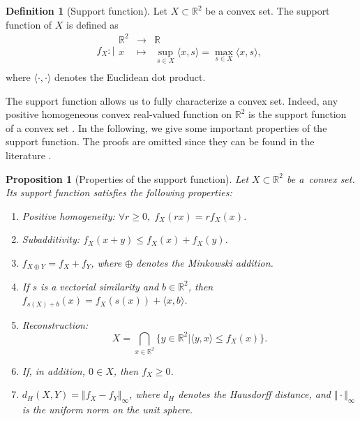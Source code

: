 \documentclass[numbers,compress,v1.0.1]{vmsta}
\newtheorem{proposition}{Proposition}
\theoremstyle{definition}
\newtheorem{definition}{Definition}
\begin{document}
\begin{definition}[Support function]
Let $X\subset\mathbb{R}^2$ be a convex set. The support function of
$X$ is defined as
%
\begin{displaymath}
f_X: \Bigg\vert %
\begin{array}{rcl}
\mathbb{R}^2 & \longrightarrow&\mathbb{R}\\
x & \longmapsto& \sup_{s\in X}\langle x,s\rangle=\max_{s\in X}\langle
x,s\rangle,\\
\end{array} %
\end{displaymath}
%
where $\langle\cdot,\cdot\rangle$ denotes the Euclidean dot product.
\end{definition}
%
The support function allows us to fully characterize a convex set.
Indeed, any positive homogeneous convex real-valued function on $\mathbb
{R}^2$ is the support function of a convex set \cite
{schneider2013convex}. In the following, we give some important
properties of the support function. The proofs are omitted since they
can be found in the literature \citep{gardner1995geometric,schneider2013convex}.
%
\begin{proposition}[Properties of the support function]
\label{prop:supportfunct}
Let $X\subset\mathbb{R}^2$ be a~convex set. Its support function
satisfies the following properties:
%
\begin{enumerate}
%
\item\label{it:positivementhomogene} \textit{Positive homogeneity}:
$\forall r\geq0,\; f_X(rx)=rf_X(x)$.
%
\item\label{it:sousadditive} \textit{Subadditivity}: $ f_X(x+y)\leq
f_X(x)+f_X(y)$.
\item\label{it:Minkadditive} $f_{X\oplus Y}= f_X+f_Y $, where $\oplus$
denotes the Minkowski addition.
%
\item\label{it:Invariance} If $s$ is a vectorial similarity and $b\in
\mathbb{R}^2$, then $f_{s(X)+b}(x)=f_X(s(x))+\langle x,b\rangle$.
%
\item\label{it:reconstruction} Reconstruction:
%
\begin{equation}
X=\bigcap_{x\in\mathbb{R}^2}\bigl\lbrace y\in
\mathbb{R}^2 \big\vert\langle y,x\rangle\leq f_X(x)\bigr
\rbrace. \label{eq:reconstruction}
\end{equation}
%
\item\label{it:positiviteContOrig} If, in addition, $0\in X$, then
$f_X\geq0$.
%
\item\label{it:hausdorff} $d_H(X,Y)=\Vert f_X-f_Y\Vert_\infty$, where
$d_H$ denotes the Hausdorff distance, and $\Vert\cdot\Vert_\infty$ is
the uniform norm on the unit sphere.
\end{enumerate}
\end{proposition}
\end{document}
